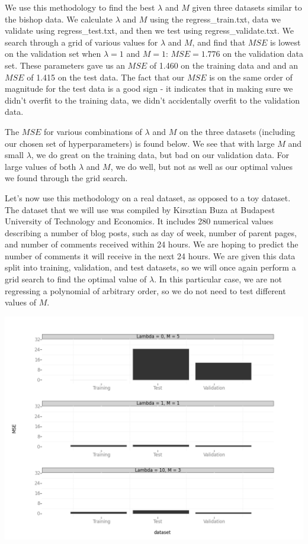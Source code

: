 \documentclass[10pt]{article}
\begin{document}
We use this methodology to find the best $\lambda$ and $M$ given three datasets similar to the bishop data. We calculate $\lambda$ and $M$ using the regress\_train.txt, data we validate using regress\_test.txt, and then we test using regress\_validate.txt. We search through a grid of various values for $\lambda$ and $M$, and find that $MSE$ is lowest on the validation set when $\lambda = 1$ and $M = 1$: $MSE = 1.776$ on the validation data set. These parameters gave us an $MSE$ of 1.460 on the training data and and an $MSE$ of 1.415 on the test data. The fact that our $MSE$ is on the same order of magnitude for the test data is a good sign - it indicates that in making sure we didn't overfit to the training data, we didn't accidentally overfit to the validation data.

The $MSE$ for various combinations of $\lambda$ and $M$ on the three datasets (including our chosen set of hyperparameters) is found below. We see that with large $M$ and small $\lambda$, we do great on the training data, but bad on our validation data. For large values of both $\lambda$ and $M$, we do well, but not as well as our optimal values we found through the grid search.

Let's now use this methodology on a real dataset, as opposed to a toy dataset. The dataset that we will use was compiled by Kirsztian Buza at Budapest University of Technology and Economics. It includes 280 numerical values describing a number of blog posts, such as day of week, number of parent pages, and number of comments received within 24 hours. We are hoping to predict the number of comments it will receive in the next 24 hours. We are given this data split into training, validation, and test datasets, so we will once again perform a grid search to find the optimal value of $\lambda$. In this particular case, we are not regressing a polynomial of arbitrary order, so we do not need to test different values of $M$.

\begin{center}
\includegraphics[scale=.4]{MSE_comparison.png}
\end{center}
\end{document}
